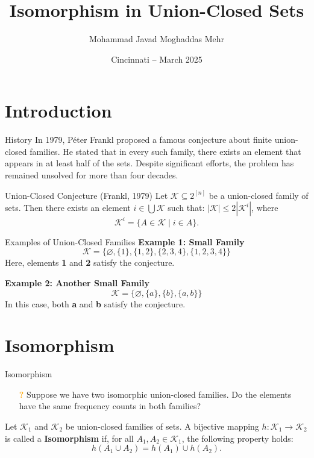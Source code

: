 \documentclass{beamer}
\title{Isomorphism in Union-Closed Sets}
\author{Mohammad Javad Moghaddas Mehr}
\institute{Bowling Green State University}
\date{Cincinnati – March 2025}
\begin{document}
\begin{frame}
	\titlepage
\end{frame}

\section{Introduction}

\begin{frame}{History}
	In 1979, Péter Frankl proposed a famous conjecture about finite union-closed families.
	He stated that in every such family, there exists an element that appears in at least half of the sets.
	Despite significant efforts, the problem has remained unsolved for more than four decades.
	\vfill
	\pause
	\begin{block}{Union-Closed Conjecture (Frankl, 1979)}
		Let \(\mathcal{K} \subseteq 2^{[n]}\) be a union-closed family of sets.
		Then there exists an element \(i \in \bigcup \mathcal{K}\) such that: \(|\mathcal{K}| \leq 2|\mathcal{K}^i|\),
		where
		\[
			\mathcal{K}^i = \{A \in \mathcal{K} \mid i \in A\}.
		\]
	\end{block}

\end{frame}



\begin{frame}{Examples of Union-Closed Families}
	\textbf{Example 1: Small Family}
	\[
		\mathcal{K} = \{\varnothing, \{1\}, \{1,2\}, \{2,3,4\}, \{1,2,3,4\}\}
	\]
	Here, elements \textbf{1} and \textbf{2} satisfy the conjecture.

	\vfill
	\pause

	\textbf{Example 2: Another Small Family}
	\[
		\mathcal{K} = \{\varnothing, \{a\}, \{b\}, \{a,b\}\}
	\]
	In this case, both \textbf{a} and \textbf{b} satisfy the conjecture.
\end{frame}

\section{Isomorphism}


\begin{frame}{Isomorphism}
	\begin{itemize}
		\item[\textcolor{orange}{\textbf{?}}]Suppose we have two isomorphic union-closed families. Do the elements have the same frequency counts in both families?
	\end{itemize}

	\vfill
	\pause
	\begin{Definition}[1.2]
		Let \( \mathcal{K}_1 \) and \( \mathcal{K}_2 \) be union-closed families of sets.
		A bijective mapping \( h: \mathcal{K}_1 \to \mathcal{K}_2 \) is called a \textbf{Isomorphism} if, for all
		\( A_1, A_2 \in \mathcal{K}_1 \), the following property holds:
		\[
			h(A_1 \cup A_2) = h(A_1) \cup h(A_2).
		\]
	\end{Definition}
\end{frame}
\end{document}
